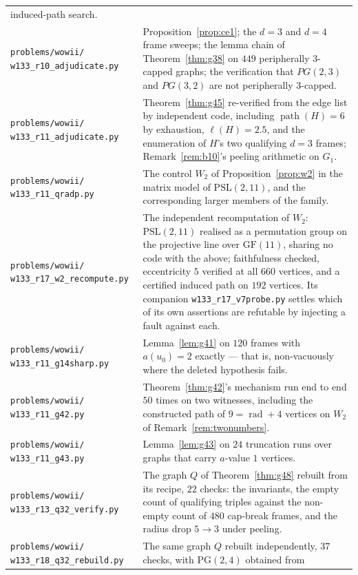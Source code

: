 \documentclass[11pt]{article}
\theoremstyle{plain}
\theoremstyle{definition}
\theoremstyle{remark}
\numberwithin{equation}{section}
\newcommand{\rad}{\operatorname{rad}}
\newcommand{\pth}{\operatorname{path}}
\begin{document}
\begin{longtable}{@{}p{}p{}@{}}
induced-path search. \\
\texttt{problems/wowii/} \texttt{w133\_r10\_adjudicate.py} &
Proposition~\ref{prop:ce1}; the $d=3$ and $d=4$ frame sweeps; the lemma chain of
Theorem~\ref{thm:g38} on $449$ peripherally $3$-capped graphs; the verification that
$PG(2,3)$ and $PG(3,2)$ are not peripherally $3$-capped. \\
\texttt{problems/wowii/} \texttt{w133\_r11\_adjudicate.py} &
Theorem~\ref{thm:g45} re-verified from the edge list by independent code, including
$\pth(H) = 6$ by exhaustion, $\ell(H) = 2.5$, and the enumeration of $H$'s two qualifying
$d = 3$ frames; Remark~\ref{rem:b10}'s peeling arithmetic on $G_1$. \\
\texttt{problems/wowii/} \texttt{w133\_r11\_qradp.py} &
The control $W_2$ of Proposition~\ref{prop:w2} in the matrix model of
$\mathrm{PSL}(2,11)$, and the corresponding larger members of the family. \\
\texttt{problems/wowii/} \texttt{w133\_r17\_w2\_recompute.py} &
The independent recomputation of $W_2$: $\mathrm{PSL}(2,11)$ realised as a permutation group
on the projective line over $\mathrm{GF}(11)$, sharing no code with the above; faithfulness
checked, eccentricity $5$ verified at all $660$ vertices, and a certified induced path on
$192$ vertices. Its companion \texttt{w133\_r17\_v7probe.py} settles which of its own
assertions are refutable by injecting a fault against each. \\
\texttt{problems/wowii/} \texttt{w133\_r11\_g14sharp.py} &
Lemma~\ref{lem:g41} on $120$ frames with $a(u_0) = 2$ exactly --- that is, non-vacuously
where the deleted hypothesis fails. \\
\texttt{problems/wowii/} \texttt{w133\_r11\_g42.py} &
Theorem~\ref{thm:g42}'s mechanism run end to end $50$ times on two witnesses, including the
constructed path of $9 = \rad+4$ vertices on $W_2$ of Remark~\ref{rem:twonumbers}. \\
\texttt{problems/wowii/} \texttt{w133\_r11\_g43.py} &
Lemma~\ref{lem:g43} on $24$ truncation runs over graphs that carry $a$-value $1$ vertices. \\
\texttt{problems/wowii/} \texttt{w133\_r13\_q32\_verify.py} &
The graph $Q$ of Theorem~\ref{thm:g48} rebuilt from its recipe, $22$ checks: the invariants,
the empty count of qualifying triples against the non-empty count of $480$ cap-break frames,
and the radius drop $5 \to 3$ under peeling. \\
\texttt{problems/wowii/} \texttt{w133\_r18\_q32\_rebuild.py} &
The same graph $Q$ rebuilt independently, $37$ checks, with $\mathrm{PG}(2,4)$ obtained from

\end{longtable}
\end{document}
